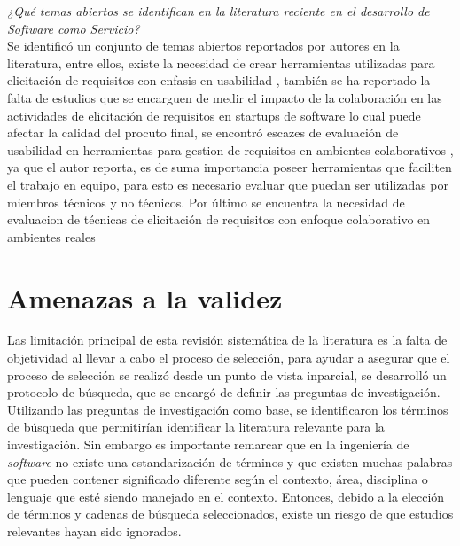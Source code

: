 \documentclass[conference,onecolumn,10pt]{IEEEtran}
\begin{document}
\emph{¿Qué temas abiertos se identifican en la literatura reciente en el desarrollo de Software como Servicio?}\\
Se identificó un conjunto de temas abiertos reportados por autores en la literatura, entre ellos, 
existe la necesidad de crear herramientas utilizadas para elicitación de requisitos con enfasis en usabilidad \cite{EF-1}, 
también se ha reportado la falta de estudios que se encarguen de medir el impacto de la colaboración en las actividades de 
elicitación de requisitos en startups de software \cite{EF-2} lo cual puede afectar la calidad del procuto final, se encontró escazes de
evaluación de usabilidad en herramientas para gestion de requisitos en ambientes colaborativos \cite{EF-3}, ya que el autor reporta, es de suma importancia
poseer herramientas que faciliten el trabajo en equipo, para esto es necesario evaluar que puedan ser utilizadas por miembros técnicos y no técnicos. 
Por último se encuentra la necesidad de evaluacion de técnicas de elicitación de requisitos con enfoque colaborativo en ambientes reales \cite{EF-9}

\section{Amenazas a la validez}
Las limitación principal de esta revisión sistemática de la literatura es la falta de objetividad al llevar a cabo el proceso de selección, 
para ayudar a asegurar que el proceso de selección se realizó desde un punto de vista inparcial, se desarrolló un protocolo de búsqueda, que se 
encargó de definir las preguntas de investigación. Utilizando las preguntas de investigación como base, se identificaron los términos de búsqueda 
que permitirían identificar la literatura relevante para la investigación. Sin embargo es importante remarcar que en la ingeniería de \emph{software}
no existe una estandarización de términos y que existen muchas palabras que pueden contener significado diferente según el contexto, área, disciplina o 
lenguaje que esté siendo manejado en el contexto. Entonces, debido a la elección de términos y cadenas de búsqueda seleccionados, existe un riesgo de que 
estudios relevantes hayan sido ignorados. 
\end{document}
